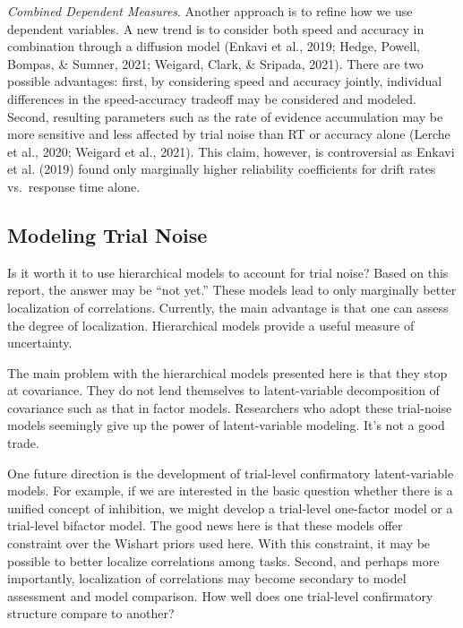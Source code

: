\documentclass[
  ,man]{apa6}
\begin{document}
\emph{Combined Dependent Measures}. Another approach is to refine how we use dependent variables. A new trend is to consider both speed and accuracy in combination through a diffusion model (Enkavi et al., 2019; Hedge, Powell, Bompas, \& Sumner, 2021; Weigard, Clark, \& Sripada, 2021). There are two possible advantages: first, by considering speed and accuracy jointly, individual differences in the speed-accuracy tradeoff may be considered and modeled. Second, resulting parameters such as the rate of evidence accumulation may be more sensitive and less affected by trial noise than RT or accuracy alone (Lerche et al., 2020; Weigard et al., 2021). This claim, however, is controversial as Enkavi et al. (2019) found only marginally higher reliability coefficients for drift rates vs.~response time alone.

\hypertarget{modeling-trial-noise}{%
\subsection{Modeling Trial Noise}\label{modeling-trial-noise}}

Is it worth it to use hierarchical models to account for trial noise? Based on this report, the answer may be ``not yet.'' These models lead to only marginally better localization of correlations. Currently, the main advantage is that one can assess the degree of localization. Hierarchical models provide a useful measure of uncertainty.

The main problem with the hierarchical models presented here is that they stop at covariance. They do not lend themselves to latent-variable decomposition of covariance such as that in factor models. Researchers who adopt these trial-noise models seemingly give up the power of latent-variable modeling. It's not a good trade.

One future direction is the development of trial-level confirmatory latent-variable models. For example, if we are interested in the basic question whether there is a unified concept of inhibition, we might develop a trial-level one-factor model or a trial-level bifactor model. The good news here is that these models offer constraint over the Wishart priors used here. With this constraint, it may be possible to better localize correlations among tasks. Second, and perhaps more importantly, localization of correlations may become secondary to model assessment and model comparison. How well does one trial-level confirmatory structure compare to another?
\end{document}
